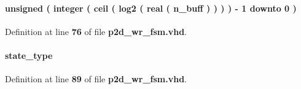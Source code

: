 \paragraph[{current\+\_\+buff\+\_\+sel\+\_\+cnt}]{ {\bfseries \textcolor{comment}{unsigned}\textcolor{vhdlchar}{ }\textcolor{vhdlchar}{(}\textcolor{vhdlchar}{ }\textcolor{vhdlchar}{ }\textcolor{vhdlchar}{ }\textcolor{vhdlchar}{ }\textcolor{comment}{integer}\textcolor{vhdlchar}{ }\textcolor{vhdlchar}{(}\textcolor{vhdlchar}{ }\textcolor{vhdlchar}{ceil}\textcolor{vhdlchar}{ }\textcolor{vhdlchar}{(}\textcolor{vhdlchar}{ }\textcolor{vhdlchar}{log2}\textcolor{vhdlchar}{ }\textcolor{vhdlchar}{(}\textcolor{vhdlchar}{ }\textcolor{comment}{real}\textcolor{vhdlchar}{ }\textcolor{vhdlchar}{(}\textcolor{vhdlchar}{ }{\bfseries {\bf n\+\_\+buff}} \textcolor{vhdlchar}{ }\textcolor{vhdlchar}{ }\textcolor{vhdlchar}{)}\textcolor{vhdlchar}{ }\textcolor{vhdlchar}{ }\textcolor{vhdlchar}{ }\textcolor{vhdlchar}{)}\textcolor{vhdlchar}{ }\textcolor{vhdlchar}{ }\textcolor{vhdlchar}{ }\textcolor{vhdlchar}{)}\textcolor{vhdlchar}{ }\textcolor{vhdlchar}{ }\textcolor{vhdlchar}{ }\textcolor{vhdlchar}{)}\textcolor{vhdlchar}{ }\textcolor{vhdlchar}{-\/}\textcolor{vhdlchar}{ } \textcolor{vhdldigit}{1} \textcolor{vhdlchar}{ }\textcolor{keywordflow}{downto}\textcolor{vhdlchar}{ }\textcolor{vhdlchar}{ } \textcolor{vhdldigit}{0} \textcolor{vhdlchar}{ }\textcolor{vhdlchar}{)}\textcolor{vhdlchar}{ }} \hspace{0.3cm}{\ttfamily [Signal]}}\label{classp2d__wr__fsm_1_1arch_a678cbb53893a5bea7bf803f7ec739185}


Definition at line {\bf 76} of file {\bf p2d\+\_\+wr\+\_\+fsm.\+vhd}.

\paragraph[{current\+\_\+state}]{ {\bfseries {\bfseries {\bf state\+\_\+type}} \textcolor{vhdlchar}{ }} \hspace{0.3cm}{\ttfamily [Signal]}}\label{classp2d__wr__fsm_1_1arch_a7ede5b91aac1f3d1b2a884a5e191d554}


Definition at line {\bf 89} of file {\bf p2d\+\_\+wr\+\_\+fsm.\+vhd}.

